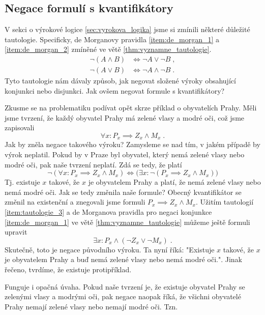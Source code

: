 \subsection{Negace formulí s kvantifikátory}
V sekci o výrokové logice \ref{sec:vyrokova_logika} jsme si zmínili některé důležité tautologie. Specificky, de Morganovy pravidla \ref{item:de_morgan_1} a \ref{item:de_morgan_2} zmíněné ve větě \ref{thm:vyznamne_tautologie}.
\begin{align*}
    \neg (A \land B) &\iff \neg A \lor \neg B\; ,\\
    \neg (A \lor B) &\iff \neg A \land \neg B\; .
\end{align*}
Tyto tautologie nám dávaly způsob, jak negovat složené výroky obsahující konjunkci nebo disjunkci. Jak ovšem negovat formule s kvantifikátory?\par
Zkusme se na problematiku podívat opět skrze příklad o obyvatelích Prahy. Měli jsme tvrzení, že každý obyvatel Prahy má zelené vlasy a modré oči, což jsme zapisovali
\begin{equation*}
    \forall x : P_x\implies Z_x \land M_x\; .
\end{equation*}
Jak by zněla negace takového výroku? Zamysleme se nad tím, v jakém případě by výrok neplatil. Pokud by v Praze byl obyvatel, který nemá zelené vlasy nebo modré oči, pak naše tvrzení neplatí. Zdá se tedy, že platí
\begin{equation*}
    \neg(\forall x : P_x\implies Z_x \land M_x) \iff \big(\exists x : \neg (P_x\implies Z_x \land M_x)\big)
\end{equation*}
Tj. existuje $x$ takové, že $x$ je obyvatelem Prahy a platí, že nemá zelené vlasy nebo nemá modré oči. Jak se tedy změnila naše formule? Obecný kvantifikátor se změnil na existenční a znegovali jsme formuli $P_x\implies Z_x \land M_x$. Užitím tautologií \ref{item:tautologie_3} a de Morganova pravidla pro negaci konjunkce \ref{item:de_morgan_1} ve větě \ref{thm:vyznamne_tautologie} můžeme ještě formuli upravit
\begin{equation*}
    \exists x : P_x\land (\neg Z_x \lor \neg M_x)\; .
\end{equation*}
Skutečně, toto je negace původního výroku. Ta nyní říká: "Existuje $x$ takové, že $x$ je obyvatelem Prahy a buď nemá zelené vlasy nebo nemá modré oči.". Jinak řečeno, tvrdíme, že existuje protipříklad.\par
Funguje i opačná úvaha. Pokud naše tvrzení je, že existuje obyvatel Prahy se zelenými vlasy a modrými oči, pak negace naopak říká, že všichni obyvatelé Prahy nemají zelené vlasy nebo nemají modré oči. Tzn.
